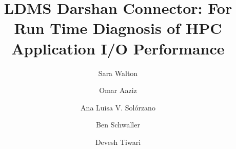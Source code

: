 \documentclass[conference]{IEEEtran}
\begin{document}
\title{LDMS Darshan Connector: For Run Time Diagnosis of HPC Application I/O Performance}


\author[1]{Sara Walton}
\author[1]{Omar Aaziz}
\author[2]{Ana Luisa V. Solórzano}
\author[1]{Ben Schwaller}
\author[2]{Devesh Tiwari}

\maketitle














\end{document}
